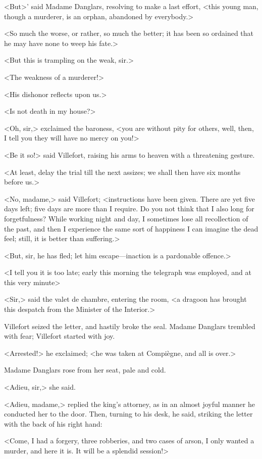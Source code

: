  <But>' said Madame Danglars, resolving to make a last effort, <this young man, though a murderer, is an orphan, abandoned by everybody.> 

 <So much the worse, or rather, so much the better; it has been so ordained that he may have none to weep his fate.> 

 <But this is trampling on the weak, sir.> 

 <The weakness of a murderer!> 

 <His dishonor reflects upon us.> 

 <Is not death in my house?> 

 <Oh, sir,> exclaimed the baroness, <you are without pity for others, well, then, I tell you they will have no mercy on you!> 

 <Be it so!> said Villefort, raising his arms to heaven with a threatening gesture. 

 <At least, delay the trial till the next assizes; we shall then have six months before us.> 

 <No, madame,> said Villefort; <instructions have been given. There are yet five days left; five days are more than I require. Do you not think that I also long for forgetfulness? While working night and day, I sometimes lose all recollection of the past, and then I experience the same sort of happiness I can imagine the dead feel; still, it is better than suffering.> 

 <But, sir, he has fled; let him escape—inaction is a pardonable offence.> 

 <I tell you it is too late; early this morning the telegraph was employed, and at this very minute\longdash> 

 <Sir,> said the valet de chambre, entering the room, <a dragoon has brought this despatch from the Minister of the Interior.> 

 Villefort seized the letter, and hastily broke the seal. Madame Danglars trembled with fear; Villefort started with joy. 

 <Arrested!> he exclaimed; <he was taken at Compiègne, and all is over.> 

 Madame Danglars rose from her seat, pale and cold. 

 <Adieu, sir,> she said. 

 <Adieu, madame,> replied the king's attorney, as in an almost joyful manner he conducted her to the door. Then, turning to his desk, he said, striking the letter with the back of his right hand: 

 <Come, I had a forgery, three robberies, and two cases of arson, I only wanted a murder, and here it is. It will be a splendid session!> 